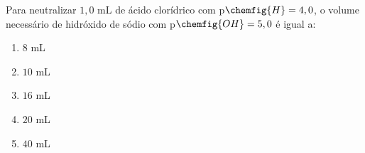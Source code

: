 Para neutralizar $1,0$ mL de ácido clorídrico com p$\chemfig{H} = 4,0$, o volume necessário de hidróxido de sódio com p$\chemfig{OH} = 5,0$ é igual a:

\begin{enumerate}[label = (\scalealph{\alph*})]
	\item $8$ mL
	\item $10$ mL
	\item $16$ mL
	\item $20$ mL
	\item $40$ mL
\end{enumerate}
